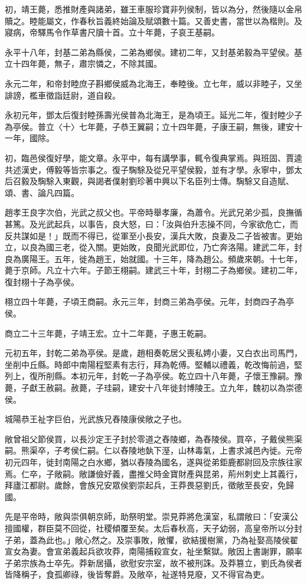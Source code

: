 \begin{pinyinscope}
初，靖王薨，悉推財產與諸弟，雖王車服珍寶非列侯制，皆以為分，然後隨以金帛贖之。睦能屬文，作春秋旨義終始論及賦頌數十篇。又善史書，當世以為楷則。及寢病，帝驛馬令作草書尺牘十首。立十年薨，子哀王基嗣。

永平十八年，封基二弟為縣侯，二弟為鄉侯。建初二年，又封基弟毅為平望侯。基立十四年薨，無子，肅宗憐之，不除其國。

永元二年，和帝封睦庶子斟鄉侯威為北海王，奉睦後。立七年，威以非睦子，又坐誹謗，檻車徵詣廷尉，道自殺。

永初元年，鄧太后復封睦孫壽光侯普為北海王，是為頃王。延光二年，復封睦少子為亭侯。普立〈十〉七年薨，子恭王翼嗣；立十四年薨，子康王嗣，無後，建安十一年，國除。

初，臨邑侯復好學，能文章。永平中，每有講學事，輒令復典掌焉。與班固、賈逵共述漢史，傅毅等皆宗事之。復子騊駼及從兄平望侯毅，並有才學。永寧中，鄧太后召毅及騊駼入東觀，與謁者僕射劉珍著中興以下名臣列士傳。騊駼又自造賦、頌、書、論凡四篇。

趙孝王良字次伯，光武之叔父也。平帝時舉孝廉，為蕭令。光武兄弟少孤，良撫循甚篤。及光武起兵，以事告，良大怒，曰：「汝與伯升志操不同，今家欲危亡，而反共謀如是！」既而不得已，從軍至小長安，漢兵大敗，良妻及二子皆被害。更始立，以良為國三老，從入關。更始敗，良聞光武即位，乃亡奔洛陽。建武二年，封良為廣陽王。五年，徙為趙王，始就國。十三年，降為趙公。頻歲來朝。十七年，薨于京師。凡立十六年。子節王栩嗣。建武三十年，封栩二子為鄉侯。建初二年，復封栩十子為亭侯。

栩立四十年薨，子頃王商嗣。永元三年，封商三弟為亭侯。元年，封商四子為亭侯。

商立二十三年薨，子靖王宏。立十二年薨，子惠王乾嗣。

元初五年，封乾二弟為亭侯。是歲，趙相奏乾居父喪私娉小妻，又白衣出司馬門，坐削中丘縣。時郎中南陽程堅素有志行，拜為乾傅。堅輔以禮義，乾改悔前過，堅列上，復所削縣。本初元年，封乾一子為亭侯。乾立四十八年薨，子懷王豫嗣。豫薨，子獻王赦嗣。赦薨，子珪嗣，建安十八年徙封博陵王。立九年，魏初以為崇德侯。

城陽恭王祉字巨伯，光武族兄舂陵康侯敞之子也。

敞曾祖父節侯買，以長沙定王子封於零道之舂陵鄉，為舂陵侯。買卒，子戴侯熊渠嗣。熊渠卒，子考侯仁嗣。仁以舂陵地埶下溼，山林毒氣，上書求減邑內徙。元帝初元四年，徙封南陽之白水鄉，猶以舂陵為國名，遂與從弟鉅鹿都尉回及宗族往家焉。仁卒，子敞嗣。敞謙儉好義，盡推父時金寶財產與昆弟，荊州刺史上其義行，拜廬江都尉。歲餘，會族兄安眾侯劉崇起兵，王莽畏惡劉氏，徵敞至長安，免歸國。

先是平帝時，敞與崇俱朝京師，助祭明堂。崇見莽將危漢室，私謂敞曰：「安漢公擅國權，群臣莫不回從，社稷傾覆至矣。太后春秋高，天子幼弱，高皇帝所以分封子弟，蓋為此也。」敞心然之。及崇事敗，敞懼，欲結援樹黨，乃為祉娶高陵侯翟宣女為妻。會宣弟義起兵欲攻莽，南陽捕殺宣女，祉坐繫獄。敞因上書謝罪，願率子弟宗族為士卒先。莽新居攝，欲慰安宗室，故不被刑誅。及莽篡立，劉氏為侯者皆降稱子，食孤卿祿，後皆奪爵。及敞卒，祉遂特見廢，又不得官為吏。


\end{pinyinscope}
